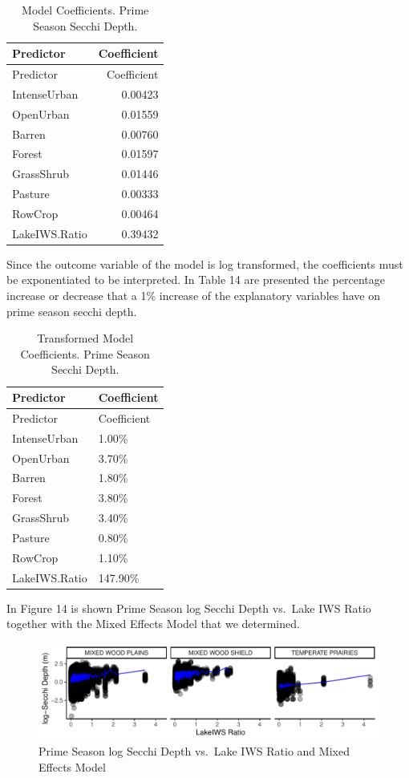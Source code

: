 \documentclass[12pt,]{article}
\begin{document}
\newpage

\begin{longtable}[]{@{}lr@{}}
\caption{Model Coefficients. Prime Season Secchi Depth.}\tabularnewline
\toprule
Predictor & Coefficient\tabularnewline
\midrule
\endfirsthead
\toprule
Predictor & Coefficient\tabularnewline
\midrule
\endhead
IntenseUrban & 0.00423\tabularnewline
OpenUrban & 0.01559\tabularnewline
Barren & 0.00760\tabularnewline
Forest & 0.01597\tabularnewline
GrassShrub & 0.01446\tabularnewline
Pasture & 0.00333\tabularnewline
RowCrop & 0.00464\tabularnewline
LakeIWS.Ratio & 0.39432\tabularnewline
\bottomrule
\end{longtable}

Since the outcome variable of the model is log transformed, the
coefficients must be exponentiated to be interpreted. In Table 14 are
presented the percentage increase or decrease that a 1\% increase of the
explanatory variables have on prime season secchi depth.

\begin{longtable}[]{@{}ll@{}}
\caption{Transformed Model Coefficients. Prime Season Secchi
Depth.}\tabularnewline
\toprule
Predictor & Coefficient\tabularnewline
\midrule
\endfirsthead
\toprule
Predictor & Coefficient\tabularnewline
\midrule
\endhead
IntenseUrban & 1.00\%\tabularnewline
OpenUrban & 3.70\%\tabularnewline
Barren & 1.80\%\tabularnewline
Forest & 3.80\%\tabularnewline
GrassShrub & 3.40\%\tabularnewline
Pasture & 0.80\%\tabularnewline
RowCrop & 1.10\%\tabularnewline
LakeIWS.Ratio & 147.90\%\tabularnewline
\bottomrule
\end{longtable}

In Figure 14 is shown Prime Season log Secchi Depth vs.~Lake IWS Ratio
together with the Mixed Effects Model that we determined.

\begin{figure}
\centering
\includegraphics{Bollt_Greif_Raby_Roth_Project_Final_files/figure-latex/unnamed-chunk-28-1.pdf}
\caption{Prime Season log Secchi Depth vs.~Lake IWS Ratio and Mixed
Effects Model}
\end{figure}
\end{document}
